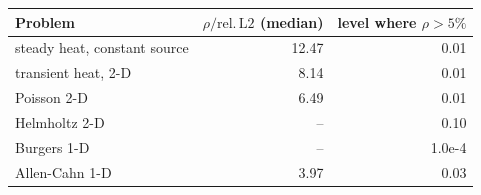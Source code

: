 \begin{tabular}{lrr}
\toprule
Problem & $\rho/\mathrm{rel.\,L2}$ (median) & level where $\rho>5\%$ \\
\midrule
steady heat, constant source & 12.47 & 0.01 \\
transient heat, 2-D & 8.14 & 0.01 \\
Poisson 2-D & 6.49 & 0.01 \\
Helmholtz 2-D & -- & 0.10 \\
Burgers 1-D & -- & 1.0e-4 \\
Allen-Cahn 1-D & 3.97 & 0.03 \\
\bottomrule
\end{tabular}
